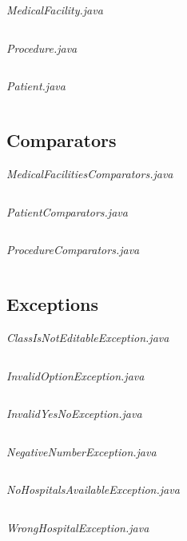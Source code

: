 \documentclass{article}
\begin{document}
	\textit{MedicalFacility.java}
	\inputminted{java}{src/main/java/com/yvesstraten/medicalconsole/facilities/MedicalFacility.java}

	\textit{Procedure.java}
	\inputminted{java}{src/main/java/com/yvesstraten/medicalconsole/facilities/Procedure.java}

	\textit{Patient.java}
	\inputminted{java}{src/main/java/com/yvesstraten/medicalconsole/Patient.java}

	\subsection{Comparators}\label{sub:comparators} %
	\textit{MedicalFacilitiesComparators.java}
	\inputminted{java}{src/main/java/com/yvesstraten/medicalconsole/comparators/MedicalFacilitiesComparators.java}

	\textit{PatientComparators.java}
	\inputminted{java}{src/main/java/com/yvesstraten/medicalconsole/comparators/PatientComparators.java}

	\textit{ProcedureComparators.java}
	\inputminted{java}{src/main/java/com/yvesstraten/medicalconsole/comparators/ProcedureComparators.java}

  \newpage

	\subsection{Exceptions}\label{sub:exceptions} %
	\textit{ClassIsNotEditableException.java}
	\inputminted{java}{src/main/java/com/yvesstraten/medicalconsole/exceptions/ClassIsNotEditableException.java}

	\textit{InvalidOptionException.java}
	\inputminted{java}{src/main/java/com/yvesstraten/medicalconsole/exceptions/InvalidOptionException.java}

	\textit{InvalidYesNoException.java}
	\inputminted{java}{src/main/java/com/yvesstraten/medicalconsole/exceptions/InvalidYesNoException.java}

	\textit{NegativeNumberException.java}
	\inputminted{java}{src/main/java/com/yvesstraten/medicalconsole/exceptions/NegativeNumberException.java}

	\textit{NoHospitalsAvailableException.java}
	\inputminted{java}{src/main/java/com/yvesstraten/medicalconsole/exceptions/NoHospitalsAvailableException.java}

	\textit{WrongHospitalException.java}
	\inputminted{java}{src/main/java/com/yvesstraten/medicalconsole/exceptions/WrongHospitalException.java}
\end{document}
